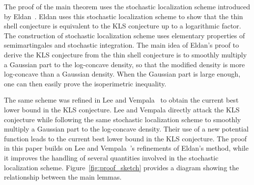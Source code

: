 \documentclass[11pt,twoside]{article}
\theoremstyle{named}
\theoremstyle{plain}
\begin{document}
The proof of the main theorem uses the stochastic localization scheme introduced by Eldan~\cite{eldan2013thin}. Eldan uses this stochastic localization scheme to show that the thin shell conjecture is equivalent to the KLS conjecture up to a logarithmic factor. The construction of stochastic localization scheme uses elementary properties of semimartingales and stochastic integration. The main idea of Eldan's proof to derive the KLS conjecture from the thin shell conjecture is to smoothly multiply a Gaussian part to the log-concave density, so that the modified density is more log-concave than a Gaussian density. When the Gaussian part is large enough, one can then easily prove the isoperimetric inequality.

The same scheme was refined in Lee and Vempala~\cite{lee2016eldan} to obtain the current best lower bound in the KLS conjecture. Lee and Vempala directly attack the KLS conjecture while following the same stochastic localization scheme to smoothly multiply a Gaussian part to the log-concave density. Their use of a new potential function leads to the current best lower bound in the KLS conjecture. The proof in this paper builds on Lee and Vempala~\cite{lee2016eldan}'s refinements of Eldan's method, while it improves the handling of several quantities involved in the stochastic localization scheme. Figure~\ref{fig:proof_sketch} provides a diagram showing the relationship between the main lemmas.
\end{document}
